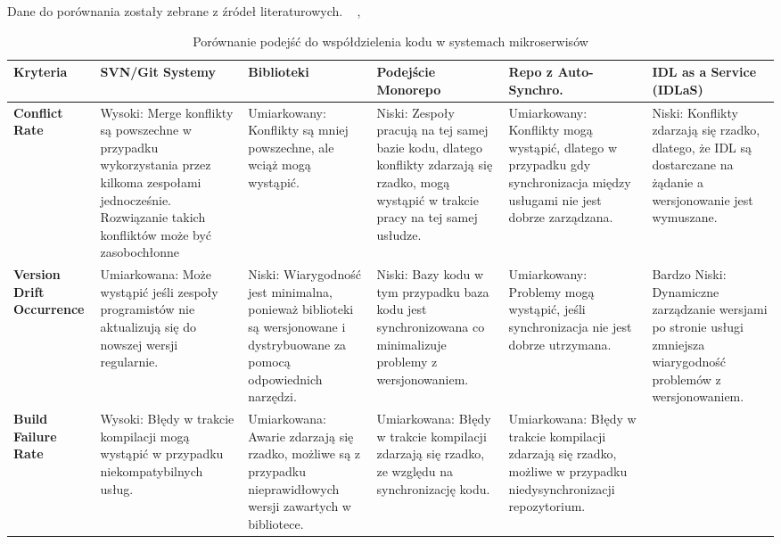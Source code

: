 \documentclass[runningheads,12pt]{llncs}
\begin{document}
Dane do porównania zostały zebrane z źródeł literaturowych. ~\cite{newman2015building} ,  ~\cite{kleppmann2017designing}
\begin{table}[htbp]
    \centering
    \caption{Porównanie podejść do współdzielenia kodu w systemach mikroserwisów}
    \label{tab:comparison}
    \begin{tabularx}{\textwidth}{|>{\raggedright\arraybackslash}X|>{\raggedright\arraybackslash}X|>{\raggedright\arraybackslash}X|>{\raggedright\arraybackslash}X|>{\raggedright\arraybackslash}X|>{\raggedright\arraybackslash}X|}
    \hline
    \textbf{Kryteria} & \textbf{SVN/Git Systemy} & \textbf{Biblioteki} & \textbf{Podejście Monorepo} & \textbf{Repo z Auto-Synchro.} & \textbf{IDL as a Service (IDLaS)} \\
    \hline
    \textbf{Conflict Rate} &
    Wysoki: Merge konflikty są powszechne w przypadku wykorzystania przez kilkoma zespołami jednocześnie. Rozwiązanie takich konfliktów może być zasobochłonne &
    Umiarkowany: Konflikty są mniej powszechne, ale wciąż mogą wystąpić. &
    Niski: Zespoły pracują na tej samej bazie kodu, dlatego konflikty zdarzają się rzadko, mogą wystąpić w trakcie pracy na tej samej usłudze. &
    Umiarkowany: Konflikty mogą wystąpić, dlatego w przypadku gdy synchronizacja między usługami nie jest dobrze zarządzana. &
    Niski: Konflikty zdarzają się rzadko, dlatego, że IDL są dostarczane na żądanie a wersjonowanie jest wymuszane. \\
    \hline
    \textbf{Version Drift Occurrence} &
    Umiarkowana: Może wystąpić jeśli zespoły programistów nie aktualizują się do nowszej wersji regularnie. &
    Niski: Wiarygodność jest minimalna, ponieważ biblioteki są wersjonowane i dystrybuowane za pomocą odpowiednich narzędzi. &
    Niski: Bazy kodu w tym przypadku baza kodu jest synchronizowana co minimalizuje problemy z wersjonowaniem. &
    Umiarkowany: Problemy mogą wystąpić, jeśli synchronizacja nie jest dobrze utrzymana. &
    Bardzo Niski: Dynamiczne zarządzanie wersjami po stronie usługi zmniejsza wiarygodność problemów z wersjonowaniem. \\
    \hline
    \textbf{Build Failure Rate} &
    Wysoki: Błędy w trakcie kompilacji mogą wystąpić w przypadku niekompatybilnych usług. &
    Umiarkowana: Awarie zdarzają się rzadko, możliwe są z przypadku nieprawidłowych wersji zawartych w bibliotece. &
    Umiarkowana: Błędy w trakcie kompilacji zdarzają się rzadko, ze względu na synchronizację kodu. &
    Umiarkowana: Błędy w trakcie kompilacji zdarzają się rzadko, możliwe w przypadku niedysynchronizacji repozytorium. &

\end{tabularx}
\end{table}
\end{document}
